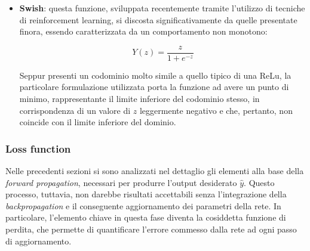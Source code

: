 \begin{itemize}
        \begin{equation}
            Y(z) = max(0, z) + min(0, \alpha * (e^{-z} - 1))
            \label{eq:ELU}
        \end{equation}

    Una formulazione simile consente, allo stesso tempo, di ottenere un'estensione del codominio, con $Y$ che può assumere valori nell'intervallo $[-1, +\infty)$, una variazione più graduale della funzione rispetto al caso di riferimento, e una derivata non più nulla o costante nella parte negativa del dominio. Anche in questo caso, inoltre, il parametro $\alpha$ può essere soggetto ad un processo di regolazione autonoma da parte della rete neurale. 

    \item \textbf{Swish}: questa funzione, sviluppata recentemente tramite l'utilizzo di tecniche di reinforcement learning, si discosta significativamente da quelle presentate finora, essendo caratterizzata da un comportamento non monotono:
    
        \begin{equation}
            Y(z) = \displaystyle \frac{z}{1 + e^{-z}}
            \label{eq:Swish}
        \end{equation}

    Seppur presenti un codominio molto simile a quello tipico di una ReLu, la particolare formulazione utilizzata porta la funzione ad avere un punto di minimo, rappresentante il limite inferiore del codominio stesso, in corrispondenza di un valore di $z$ leggermente negativo e che, pertanto, non coincide con il limite inferiore del dominio.  
    
\end{itemize}


\subsubsection{Loss function}

Nelle precedenti sezioni si sono analizzati nel dettaglio gli elementi alla base della \textit{forward propagation}, necessari per produrre l'output desiderato $\hat{y}$. Questo processo, tuttavia, non darebbe risultati accettabili senza l'integrazione della \textit{backpropagation} e il conseguente aggiornamento dei parametri della rete. In particolare, l'elemento chiave in questa fase diventa la cosiddetta funzione di perdita, che permette di quantificare l'errore commesso dalla rete ad ogni passo di aggiornamento. 

